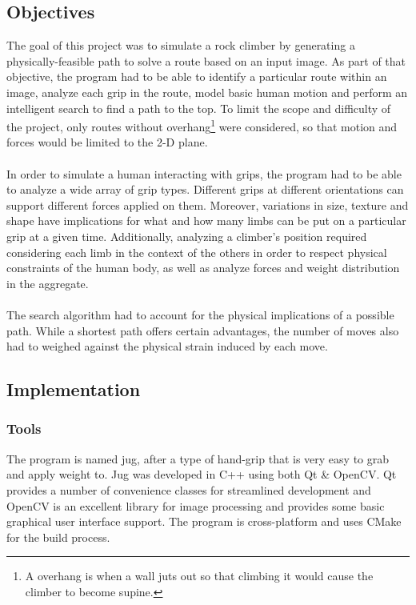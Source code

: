 \documentclass[pdftex,12pt]{article}
\theoremstyle{definition}
\theoremstyle{remark}
\begin{document}
\subsection*{Objectives}
The goal of this project was to simulate a rock climber by generating a physically-feasible path to solve a route based on an input image. As part of that objective, the program had to be able to identify a particular route within an image, analyze each grip in the route, model basic human motion and perform an intelligent search to find a path to the top. To limit the scope and difficulty of the project, only routes without overhang\footnote{A overhang is when a wall juts out so that climbing it would cause the climber to become supine.} were considered, so that motion and forces would be limited to the 2-D plane. \\ \\
In order to simulate a human interacting with grips, the program had to be able to analyze a wide array of grip types. Different grips at different orientations can support different forces applied on them. Moreover, variations in size, texture and shape have implications for what and how many limbs can be put on a particular grip at a given time. Additionally, analyzing a climber's position required considering each limb in the context of the others in order to respect physical constraints of the human body, as well as analyze forces and weight distribution in the aggregate. \\ \\ 
The search algorithm had to account for the physical implications of a possible path. While a shortest path offers certain advantages, the number of moves also had to weighed against the physical strain induced by each move.

\subsection*{Implementation}
\subsubsection*{Tools}
The program is named jug, after a type of hand-grip that is very easy to grab and apply weight to. 
Jug was developed in C++ using both Qt \& OpenCV. Qt provides a number of convenience classes for streamlined development and OpenCV is an excellent library for image processing and provides some basic graphical user interface support. The program is cross-platform and uses CMake for the build process.
\end{document}
